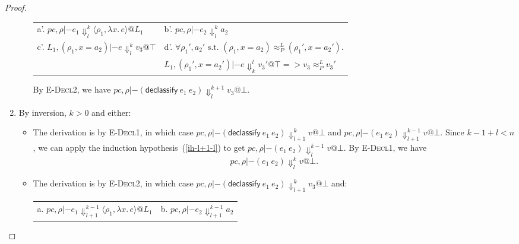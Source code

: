\documentclass{article}
\makeatletter
\theoremstyle{definition}
\newcommand{\at}{\ensuremath{{\scriptstyle{@}}}}
\newcommand{\pc}{\ensuremath{{\mathit{pc}}}}
\makeatother
\begin{document}
\begin{proof}
\begin{enumerate}
\begin{itemize}
        \begin{center}
          \begin{tabular*}{1.0\linewidth}{l@{\qquad}l}
            a'.
            $\pc, \rho |- e_1
            \Downarrow^{k}_{l}
            \langle{\rho_1, \lambda{x}.\, e\rangle} \at L_1$
            &
            b'.
            $\pc, \rho |- e_2
            \Downarrow^{k}_{l}
            a_2$
            \\[1.8ex]
            c'.
            $L_1, (\rho_1, x = a_2) |- e
            \Downarrow^{k}_{l}
            v_3 \at \top$
            &
            d'.
            $\forall{\rho_1', a_2' \text{ s.t. }
              (\rho_1, x = a_2) \approx^{L}_{P} (\rho_1', x = a_2')}.$
            \\
            &
            \quad\quad
            $L_1, (\rho_1', x = a_2') |- e \Downarrow^{l}_{k} v_3' \at \top =>
            v_3 \approx^{L}_{P} v_3'$
          \end{tabular*}
        \end{center}
        By \textsc{E-Decl2}, we have
        $\pc, \rho |- (\mathsf{declassify}\ e_1\ e_2)
        \Downarrow^{k+1}_{l}
        v_3 \at \bot$.
      \end{itemize}
    \item By inversion, $k > 0$ and either:
      \begin{itemize}
      \item The derivation is by \textsc{E-Decl1},
        in which case
        $\pc, \rho |- (\mathsf{declassify}\ e_1\ e_2)
        \Downarrow^{k}_{l+1}
        v \at \bot$ and
        $\pc, \rho |- (e_1\ e_2) \Downarrow^{k-1}_{l+1} v \at \bot$.
        Since $k-1 + l < n$, we can apply the induction
        hypothesis~(\ref{ih-l+1-l}) to get
        $\pc, \rho |- (e_1\ e_2) \Downarrow^{k-1}_{l} v \at \bot$.
        By \textsc{E-Decl1}, we have
        \[ \pc, \rho |- (e_1\ e_2) \Downarrow^{k}_{l} v \at \bot. \]
      \item The derivation is by \textsc{E-Decl2},
        in which case
        $\pc, \rho |- (\mathsf{declassify}\ e_1\ e_2)
        \Downarrow^{k}_{l+1}
        v_3 \at \bot$ and:
        \begin{center}
          \begin{tabular*}{1.0\linewidth}{ll}
            a.
            $\pc, \rho |- e_1
            \Downarrow^{k-1}_{l+1}
            \langle{\rho_1, \lambda{x}.\, e\rangle} \at L_1$
            &
            b.
            $\pc, \rho |- e_2
            \Downarrow^{k-1}_{l+1}
            a_2$
            \\[1.8ex]

\end{tabular*}
\end{center}
\end{itemize}
\end{enumerate}
\end{proof}
\end{document}
